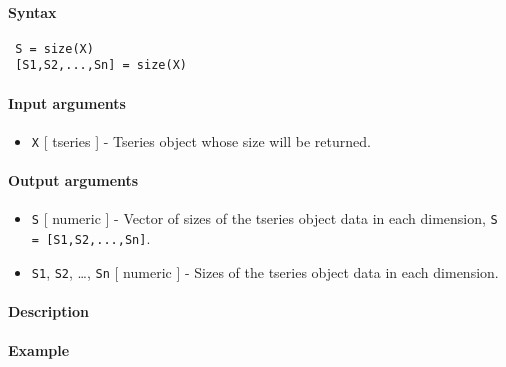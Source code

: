 


	\paragraph{Syntax}
 
 \begin{verbatim}
 S = size(X)
 [S1,S2,...,Sn] = size(X)
 \end{verbatim}
 
 \paragraph{Input arguments}
 
 \begin{itemize}
 \item
   \texttt{X} {[} tseries {]} - Tseries object whose size will be
   returned.
 \end{itemize}
 
 \paragraph{Output arguments}
 
 \begin{itemize}
 \item
   \texttt{S} {[} numeric {]} - Vector of sizes of the tseries object
   data in each dimension, \texttt{S = {[}S1,S2,...,Sn{]}}.
 \item
   \texttt{S1}, \texttt{S2}, \ldots{}, \texttt{Sn} {[} numeric {]} -
   Sizes of the tseries object data in each dimension.
 \end{itemize}
 
 \paragraph{Description}
 
 \paragraph{Example}


